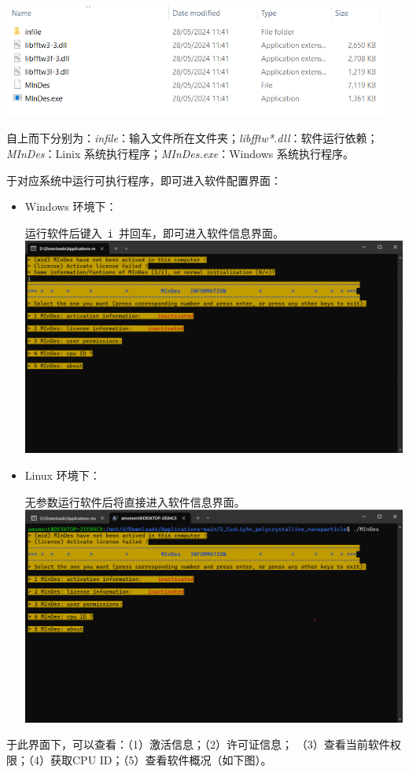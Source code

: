 \includegraphics[width=5in]{rsc/example_folder.png}

自上而下分别为：\emph{infile}：输入文件所在文件夹；\emph{libfftw*.dll}：软件运行依赖；
\emph{MInDes}：Linix 系统执行程序；\emph{MInDes.exe}：Windows 系统执行程序。

于对应系统中运行可执行程序，即可进入软件配置界面：
\begin{itemize}
  \item {\color{magenta}Windows 环境下}：

        运行软件后键入\ \verb|i|\ 并回车，即可进入软件信息界面。\\
        \includegraphics[width=5in]{rsc/mid_info_win.png}

  \item {\color{magenta}Linux 环境下}：

        无参数运行软件后将直接进入软件信息界面。\\
        \includegraphics[width=5in]{rsc/mid_info_linux.png}

\end{itemize}
于此界面下，可以查看：（1）激活信息；（2）许可证信息；
（3）查看当前软件权限；（4）获取CPU ID；（5）查看软件概况（如下图）。

